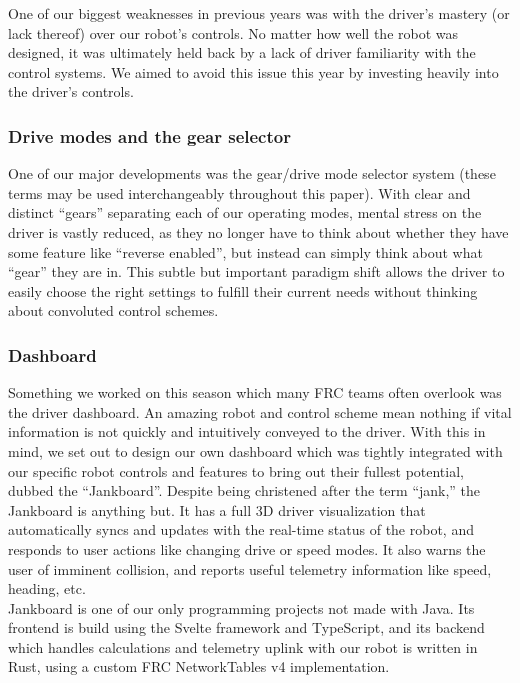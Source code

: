 One of our biggest weaknesses in previous years was with the driver's
mastery (or lack thereof) over our robot's controls. No matter how well
the robot was designed, it was ultimately held back by a lack of driver
familiarity with the control systems. We aimed to avoid this issue this
year by investing heavily into the driver's controls.

\subsubsection{Drive modes and the gear selector}

One of our major developments was the gear/drive mode selector system
(these terms may be used interchangeably throughout this paper). With
clear and distinct ``gears'' separating each of our operating modes,
mental stress on the driver is vastly reduced, as they no longer have to
think about whether they have some feature like ``reverse enabled'', but
instead can simply think about what ``gear'' they are in. This subtle
but important paradigm shift allows the driver to easily choose the
right settings to fulfill their current needs without thinking about
convoluted control schemes. \\

\blindtext{}

\subsubsection{Dashboard}

Something we worked on this season which many FRC teams often overlook
was the driver dashboard. An amazing robot and control scheme mean
nothing if vital information is not quickly and intuitively conveyed to
the driver. With this in mind, we set out to design our own dashboard
which was tightly integrated with our specific robot controls and
features to bring out their fullest potential, dubbed the ``Jankboard''.
Despite being christened after the term ``jank,'' the Jankboard is
anything but. It has a full 3D driver visualization that automatically
syncs and updates with the real-time status of the robot, and responds
to user actions like changing drive or speed modes. It also warns the
user of imminent collision, and reports useful telemetry information
like speed, heading, etc. \\

Jankboard is one of our only programming projects not made with Java.
Its frontend is build using the Svelte framework and TypeScript, and its
backend which handles calculations and telemetry uplink with our robot
is written in Rust, using a custom FRC NetworkTables v4 implementation.
